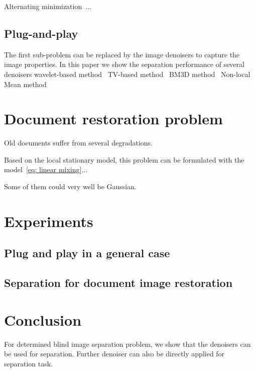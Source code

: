 \documentclass[conference]{IEEEtran}
\theoremstyle{plain}
\begin{document}
Alternating minimization~\cite{tseng2001convergence}...


\subsection{Plug-and-play}
The first sub-problem can be replaced by the image denoisers to capture the image properties. In this paper we show the separation performance of several denoisers
wavelet-based method~\cite{donoho1994ideal,chang2000adaptive}
TV-based method~\cite{chambolle2004algorithm}
BM3D method~\cite{dabov2007image}
Non-local Mean method~\cite{buades2005non}


\section{Document restoration problem}
\label{sec: document restoration}
Old documents suffer from several degradations. 

Based on the local stationary model, this problem can be formulated with the model~\eqref{eq: linear mixing}... 

Some of them could very well be Gaussian.
 


\section{Experiments}
\label{sec: xp}


\subsection{Plug and play in a general case}

 
 
\subsection{Separation for document image restoration}



\section{Conclusion}
\label{sec: conclusion}
For determined blind image separation problem, we show that the denoisers can be used for separation. Further denoiser can also be directly applied for separation task.



\end{document}
